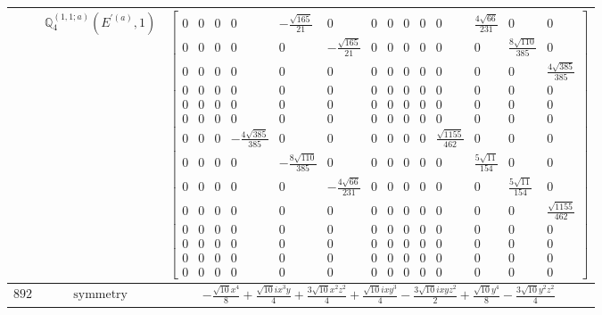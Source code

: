 \documentclass[fleqn,8pt,landscape]{jsarticle}
\begin{document}
\begin{longtable}{ccc}
$  $ & $ \mathbb{Q}_{4}^{(1,1;a)}(E^{\prime(a)},1) $ & $ \begin{bmatrix} 0 & 0 & 0 & 0 & - \frac{\sqrt{165}}{21} & 0 & 0 & 0 & 0 & 0 & 0 & \frac{4 \sqrt{66}}{231} & 0 & 0 \\ 0 & 0 & 0 & 0 & 0 & - \frac{\sqrt{165}}{21} & 0 & 0 & 0 & 0 & 0 & 0 & \frac{8 \sqrt{110}}{385} & 0 \\ 0 & 0 & 0 & 0 & 0 & 0 & 0 & 0 & 0 & 0 & 0 & 0 & 0 & \frac{4 \sqrt{385}}{385} \\ 0 & 0 & 0 & 0 & 0 & 0 & 0 & 0 & 0 & 0 & 0 & 0 & 0 & 0 \\ 0 & 0 & 0 & 0 & 0 & 0 & 0 & 0 & 0 & 0 & 0 & 0 & 0 & 0 \\ 0 & 0 & 0 & 0 & 0 & 0 & 0 & 0 & 0 & 0 & 0 & 0 & 0 & 0 \\ 0 & 0 & 0 & - \frac{4 \sqrt{385}}{385} & 0 & 0 & 0 & 0 & 0 & 0 & \frac{\sqrt{1155}}{462} & 0 & 0 & 0 \\ 0 & 0 & 0 & 0 & - \frac{8 \sqrt{110}}{385} & 0 & 0 & 0 & 0 & 0 & 0 & \frac{5 \sqrt{11}}{154} & 0 & 0 \\ 0 & 0 & 0 & 0 & 0 & - \frac{4 \sqrt{66}}{231} & 0 & 0 & 0 & 0 & 0 & 0 & \frac{5 \sqrt{11}}{154} & 0 \\ 0 & 0 & 0 & 0 & 0 & 0 & 0 & 0 & 0 & 0 & 0 & 0 & 0 & \frac{\sqrt{1155}}{462} \\ 0 & 0 & 0 & 0 & 0 & 0 & 0 & 0 & 0 & 0 & 0 & 0 & 0 & 0 \\ 0 & 0 & 0 & 0 & 0 & 0 & 0 & 0 & 0 & 0 & 0 & 0 & 0 & 0 \\ 0 & 0 & 0 & 0 & 0 & 0 & 0 & 0 & 0 & 0 & 0 & 0 & 0 & 0 \\ 0 & 0 & 0 & 0 & 0 & 0 & 0 & 0 & 0 & 0 & 0 & 0 & 0 & 0 \end{bmatrix} $ \\ \hline
$ 892 $ & $ \text{symmetry} $ & $ - \frac{\sqrt{10} x^{4}}{8} + \frac{\sqrt{10} i x^{3} y}{4} + \frac{3 \sqrt{10} x^{2} z^{2}}{4} + \frac{\sqrt{10} i x y^{3}}{4} - \frac{3 \sqrt{10} i x y z^{2}}{2} + \frac{\sqrt{10} y^{4}}{8} - \frac{3 \sqrt{10} y^{2} z^{2}}{4} $ \\

\end{longtable}
\end{document}
